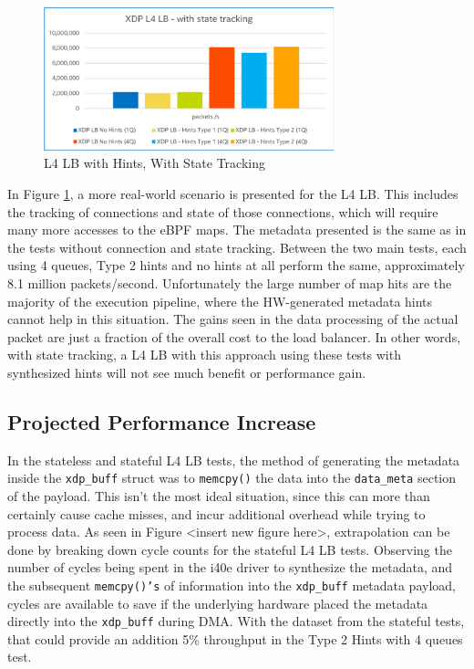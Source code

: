 \documentclass[letterpaper]{article}
\begin{document}
\begin{figure}[h]
\includegraphics[width=3.31in]{l4-perf-with-tracking.png}
\caption{L4 LB with Hints, With State Tracking}
\label{l4-perf-with-tracking}
\end{figure}
In Figure \ref{l4-perf-with-tracking}, a more real-world scenario is presented for the L4 LB.  This includes the tracking of connections and state of those connections, which will require many more accesses to the eBPF maps.  The metadata presented is the same as in the tests without connection and state tracking.
\newline
\newline
Between the two main tests, each using 4 queues, Type 2 hints and no hints at all perform the same, approximately 8.1 million packets/second.  Unfortunately the large number of map hits are the majority of the execution pipeline, where the HW-generated metadata hints cannot help in this situation.  The gains seen in the data processing of the actual packet are just a fraction of the overall cost to the load balancer.  In other words, with state tracking, a L4 LB with this approach using these tests with synthesized hints will not see much benefit or performance gain.

\subsection{Projected Performance Increase}
In the stateless and stateful L4 LB tests, the method of generating the metadata inside the {\small \texttt{xdp\_buff}} struct was to {\small \texttt{memcpy()}} the data into the {\small \texttt{data\_meta}} section of the payload.  This isn’t the most ideal situation, since this can more than certainly cause cache misses, and incur additional overhead while trying to process data.
\newline
\newline
As seen in Figure <insert new figure here>, extrapolation can be done by breaking down cycle counts for the stateful L4 LB tests.  Observing the number of cycles being spent in the i40e driver to synthesize the metadata, and the subsequent {\small \texttt{memcpy()’s}} of information into the {\small \texttt{xdp\_buff}} metadata payload, cycles are available to save if the underlying hardware placed the metadata directly into the {\small \texttt{xdp\_buff}} during DMA.  With the dataset from the stateful tests, that could provide an addition 5\% throughput in the Type 2 Hints with 4 queues test.
\end{document}

